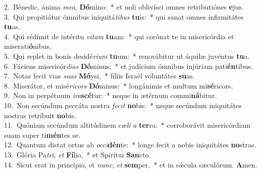 {2.~}Bénedic, ánima \textit{me}\textit{a}, \textbf{Dó}mino:~* et noli oblivísci omnes retributiónes \textbf{e}jus.\\
{3.~}Qui propitiátur ómnibus iniquitá\textit{ti}\textit{bus} \textbf{tu}is:~* qui sanat omnes infirmitátes \textbf{tu}as.\\
{4.~}Qui rédimit de intéritu \textit{vi}\textit{tam} \textbf{tu}am:~* qui corónat te in misericórdia et miserati\textbf{ó}nibus.\\
{5.~}Qui replet in bonis desidé\textit{ri}\textit{um} \textbf{tu}um:~* renovábitur ut áquilæ juvéntus \textbf{tu}a.\\
{6.~}Fáciens misericór\textit{di}\textit{as} \textbf{Dó}minus:~* et judícium ómnibus injúriam pati\textbf{én}tibus.\\
{7.~}Notas fecit vias \textit{su}\textit{as} \textbf{Mó}ysi,~* fíliis Israël voluntátes \textbf{su}as.\\
{8.~}Miserátor, et misé\textit{ri}\textit{cors} \textbf{Dó}minus:~* longánimis et multum mi\textbf{sé}ricors.\\
{9.~}Non in perpétuum \textit{i}\textit{ra}\textbf{scé}tur:~* neque in ætérnum commi\textbf{ná}bitur.\\
{10.~}Non secúndum peccáta nostra \textit{fe}\textit{cit} \textbf{no}bis:~* neque secúndum iniquitátes nostras retríbuit \textbf{no}bis.\\
{11.~}Quóniam secúndum altitúdinem cæ\textit{li} \textit{a} \textbf{ter}ra:~* corroborávit misericórdiam suam super ti\textbf{mén}tes se.\\
{12.~}Quantum distat ortus ab \textit{oc}\textit{ci}\textbf{dén}te:~* longe fecit a nobis iniquitátes \textbf{no}stras.\\
{13.~}Glória Pa\textit{tri}, \textit{et} \textbf{Fí}lio,~* et Spirítui \textbf{San}cto.\\
{14.~}Sicut erat in princípio, et \textit{nunc}, \textit{et} \textbf{sem}per,~* et in sǽcula sæculórum. \textbf{A}men.\\
